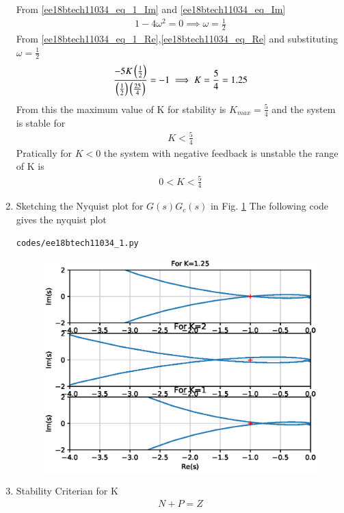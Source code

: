 \begin{enumerate}[label=\thesubsection.\arabic*.,ref=\thesubsection.\theenumi]
From \eqref{ee18btech11034_eq_1_Im} and \eqref{ee18btech11034_eq_Im}
\begin{align}
    1-4\omega^2 = 0
    \implies \omega = \frac{1}{2} 
\end{align}
From  \eqref{ee18btech11034_eq_1_Re},\eqref{ee18btech11034_eq_Re} and substituting $\omega = \frac{1}{2}$
\begin{align}
    \frac{-5K\left(\frac{1}{2}\right)}{\left(\frac{1}{2}\right)\left(\frac{25}{4}\right)} = -1
    \implies K = \frac{5}{4} = 1.25
\end{align}
From this the maximum value of K for stability is $K_{max} = \frac{5}{4}$ and the system is stable for 
\begin{align}
    K < \frac{5}{4}
\end{align}
Pratically for $K < 0$ the system with negative feedback is unstable the range of K is 
\begin{align}
    0 < K < \frac{5}{4}
\end{align}
\item Sketching the Nyquist plot for $G(s)G_c(s)$ in Fig. \ref{fig:ee18btech11034_1}
The following code gives the nyquist plot
\begin{lstlisting}
codes/ee18btech11034_1.py
\end{lstlisting}
\begin{figure}[!h]
\centering
\includegraphics[width=\columnwidth]{./figs/ee18btech11034_1.eps}
\caption{}
\label{fig:ee18btech11034_1}
\end{figure}
\item Stability Criterian for K
\begin{align}
    N + P = Z
    \label{ee18btech11034_Z}
\end{align}
\begin{table}[!ht]
\centering

\caption{}
\label{table:ee18btech11034_table1}
\end{table}


\end{enumerate}
